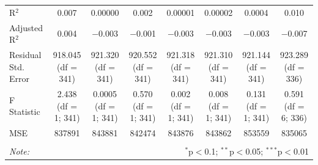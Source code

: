 \documentclass[12pt]{article}
\begin{document}
\begin{table}[!htbp]
\begin{adjustbox}{width=\textwidth}
\begin{tabular}{@{\extracolsep{5pt}}lccccccc}
R$^{2}$ & 0.007 & 0.00000 & 0.002 & 0.00001 & 0.00002 & 0.0004 & 0.010 \\ 
Adjusted R$^{2}$ & 0.004 & $-$0.003 & $-$0.001 & $-$0.003 & $-$0.003 & $-$0.003 & $-$0.007 \\ 
Residual Std. Error & 918.045 (df = 341) & 921.320 (df = 341) & 920.552 (df = 341) & 921.318 (df = 341) & 921.310 (df = 341) & 921.144 (df = 341) & 923.289 (df = 336) \\ 
F Statistic & 2.438 (df = 1; 341) & 0.0005 (df = 1; 341) & 0.570 (df = 1; 341) & 0.002 (df = 1; 341) & 0.008 (df = 1; 341) & 0.131 (df = 1; 341) & 0.591 (df = 6; 336) \\ 
MSE & 837891 & 843881 & 842474 & 843876 & 843862 & 853559 & 835065 \\
\hline 
\hline \\[-1.8ex] 
\textit{Note:}  & \multicolumn{7}{r}{$^{*}$p$<$0.1; $^{**}$p$<$0.05; $^{***}$p$<$0.01} \\ 
\end{tabular} 
\end{adjustbox}
\end{table} 
\end{document}
